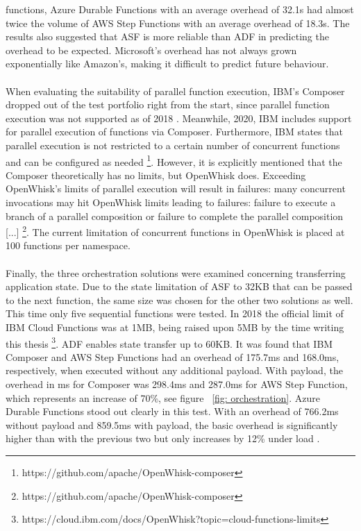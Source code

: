 \documentclass[11pt]{article}
\begin{document}
functions, Azure Durable Functions with an average overhead of 32.1s had almost twice the volume of AWS Step Functions with an average overhead of 18.3s. The results also suggested that ASF is more reliable than ADF in predicting the overhead to be expected. Microsoft's overhead has not always grown exponentially like Amazon's, making it difficult to predict future behaviour.\\\\ When evaluating the suitability of parallel function execution, IBM's Composer dropped out of the test portfolio right from the start, since parallel function execution was not supported as of 2018 \cite{lopez2018comparison}. Meanwhile, 2020, IBM includes support for parallel execution of functions via Composer. Furthermore, IBM states that parallel execution is not restricted to a certain number of concurrent functions and can be configured as needed \footnote{https://github.com/apache/OpenWhisk-composer }. However, it is explicitly mentioned that the Composer theoretically has no limits, but OpenWhisk does. Exceeding OpenWhisk's limits of parallel execution will result in failures: \glqq[...] many concurrent invocations may hit OpenWhisk limits leading to failures: failure to execute a branch of a parallel composition or failure to complete the parallel composition [...]\grqq{} \footnote{https://github.com/apache/OpenWhisk-composer}. The current limitation of concurrent functions in OpenWhisk is placed at 100 functions per namespace.\\\\ Finally, the three orchestration solutions were examined concerning transferring application state. Due to the state limitation of ASF to 32KB that can be passed to the next function, the same size was chosen for the other two solutions as well. This time only five sequential functions were tested. In 2018 the official limit of IBM Cloud Functions was at 1MB, being raised upon 5MB by the time writing this thesis \footnote{https://cloud.ibm.com/docs/OpenWhisk?topic=cloud-functions-limits}. ADF enables state transfer up to 60KB. It was found that IBM Composer and AWS Step Functions had an overhead of 175.7ms and 168.0ms, respectively,  when executed without any additional payload. With payload, the overhead in ms for Composer was 298.4ms and 287.0ms for AWS Step Function, which represents an increase of 70\%, see figure ~\ref{fig: orchestration}. Azure Durable Functions stood out clearly in this test. With an overhead of 766.2ms without payload and 859.5ms with payload, the basic overhead is significantly higher than with the previous two but only increases by 12\% under load \cite{lopez2018comparison}.
\end{document}
